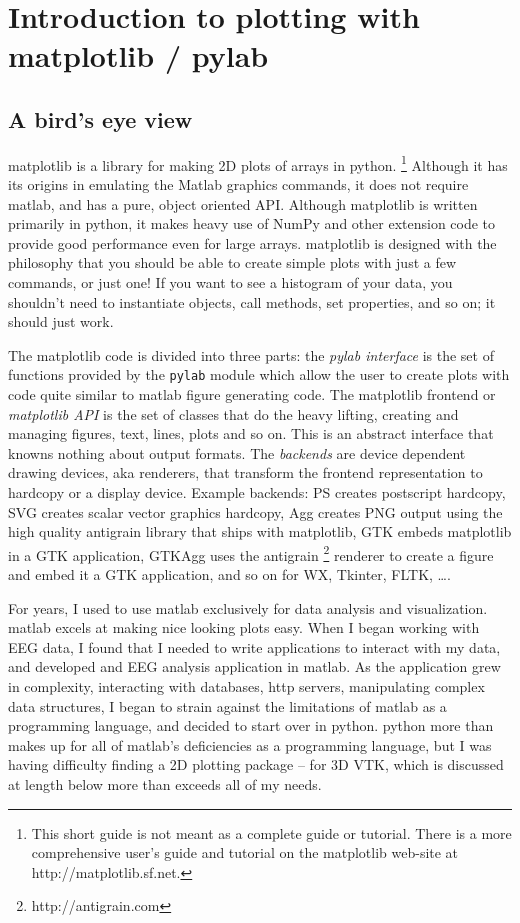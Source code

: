 
\chapter[matplotlib]{Introduction to plotting with matplotlib / pylab}


\section[Overview]{A bird's eye view}

matplotlib is a library for making 2D plots of arrays in python.%
\footnote{This short guide is not meant as a complete guide or tutorial. There
  is a more comprehensive user's guide and tutorial on the matplotlib web-site
  at http://matplotlib.sf.net.%
} Although it has its origins in emulating the Matlab graphics commands, it
does not require matlab, and has a pure, object oriented API. Although
matplotlib is written primarily in python, it makes heavy use of NumPy and
other extension code to provide good performance even for large
arrays. matplotlib is designed with the philosophy that you should be able to
create simple plots with just a few commands, or just one!  If you want to see
a histogram of your data, you shouldn't need to instantiate objects, call
methods, set properties, and so on; it should just work.

The matplotlib code is divided into three parts: the \textit{pylab
interface} is the set of functions provided by the \texttt{pylab}
module which allow the user to create plots with code quite similar
to matlab figure generating code. The matplotlib frontend or \textit{matplotlib
API} is the set of classes that do the heavy lifting, creating and
managing figures, text, lines, plots and so on. This is an abstract
interface that knowns nothing about output formats. The \textit{backends}
are device dependent drawing devices, aka renderers, that transform
the frontend representation to hardcopy or a display device. Example
backends: PS creates postscript hardcopy, SVG creates scalar vector
graphics hardcopy, Agg creates PNG output using the high quality antigrain
library that ships with matplotlib, GTK embeds matplotlib in a GTK
application, GTKAgg uses the antigrain%
\footnote{http://antigrain.com%
} renderer to create a figure and embed it a GTK application, and so
on for WX, Tkinter, FLTK, \ldots{}.

For years, I used to use matlab exclusively for data analysis and
visualization. matlab excels at making nice looking plots easy. When
I began working with EEG data, I found that I needed to write applications
to interact with my data, and developed and EEG analysis application
in matlab. As the application grew in complexity, interacting with
databases, http servers, manipulating complex data structures, I began
to strain against the limitations of matlab as a programming language,
and decided to start over in python. python more than makes up for
all of matlab's deficiencies as a programming language, but I was
having difficulty finding a 2D plotting package -- for 3D VTK, which
is discussed at length below more than exceeds all of my needs.


